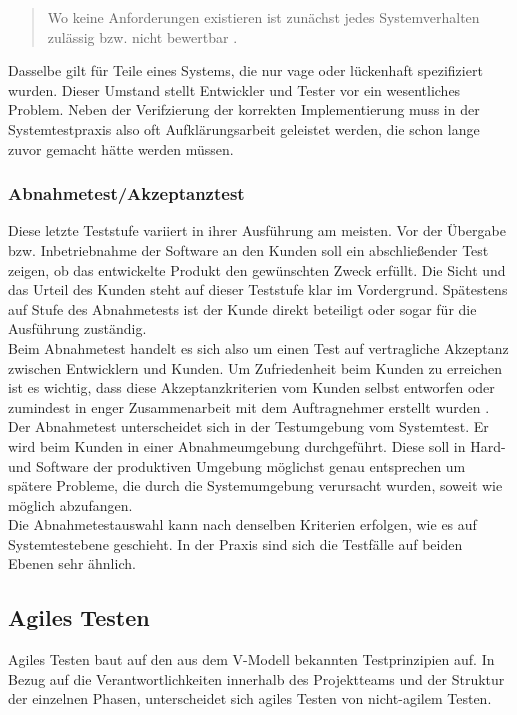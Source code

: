\begin{quote}
Wo keine Anforderungen existieren ist zunächst jedes Systemverhalten zulässig bzw. nicht bewertbar \cite{spillner_basiswissen_2012}.
\end{quote}
Dasselbe gilt für Teile eines Systems, die nur vage oder lückenhaft spezifiziert wurden. Dieser Umstand stellt Entwickler und Tester vor ein wesentliches Problem. Neben der Verifzierung der korrekten Implementierung muss in der Systemtestpraxis also oft Aufklärungsarbeit geleistet werden, die schon lange zuvor gemacht hätte werden müssen.

\subsubsection{Abnahmetest/Akzeptanztest}
Diese letzte Teststufe variiert in ihrer Ausführung am meisten. Vor der Übergabe bzw. Inbetriebnahme der Software an den Kunden soll ein abschließender Test zeigen, ob das entwickelte Produkt den gewünschten Zweck erfüllt. Die Sicht und das Urteil des Kunden steht auf dieser Teststufe klar im Vordergrund. Spätestens auf Stufe des Abnahmetests ist der Kunde direkt beteiligt oder sogar für die Ausführung zuständig.\\
Beim Abnahmetest handelt es sich also um einen Test auf vertragliche Akzeptanz zwischen Entwicklern und Kunden. Um Zufriedenheit beim Kunden zu erreichen ist es wichtig, dass diese Akzeptanzkriterien vom Kunden selbst entworfen oder zumindest in enger Zusammenarbeit mit dem Auftragnehmer erstellt wurden \cite{spillner_basiswissen_2012}. Der Abnahmetest unterscheidet sich in der Testumgebung vom Systemtest. Er wird beim Kunden in einer Abnahmeumgebung durchgeführt. Diese soll in Hard- und Software der produktiven Umgebung möglichst genau entsprechen um spätere Probleme, die durch die Systemumgebung verursacht wurden, soweit wie möglich abzufangen.\\
Die Abnahmetestauswahl kann nach denselben Kriterien erfolgen, wie es auf Systemtestebene geschieht. In der Praxis sind sich die Testfälle auf beiden Ebenen sehr ähnlich.

\subsection{Agiles Testen}
Agiles Testen baut auf den aus dem V-Modell bekannten Testprinzipien auf. In Bezug auf die Verantwortlichkeiten innerhalb des Projektteams und der Struktur der einzelnen Phasen, unterscheidet sich agiles Testen von nicht-agilem Testen. 


